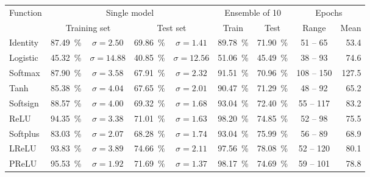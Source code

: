 \begin{table}[H]
    \centering
    \setlength\tabcolsep{1.5pt}
    \begin{tabular}{@{\extracolsep{4pt}}lcccccccr@{}}
    \toprule
    \multirow{2}{*}{Function} & \multicolumn{4}{c}{Single model}              & \multicolumn{2}{c}{Ensemble of 10} & \multicolumn{2}{c}{Epochs}\\\cline{2-5}\cline{6-7}\cline{8-9}
                              & \multicolumn{2}{c}{Training set}     &\multicolumn{2}{c}{Test set}                  & Train                & Test                 & Range     & \multicolumn{1}{c}{Mean} \\\midrule
    Identity                  & \SI{87.49}{\percent} & $\sigma=2.50$ & \SI{69.86}{\percent} & $\sigma=1.41$         & \SI{89.78}{\percent} & \SI{71.90}{\percent} & \hphantom{0}51 -- \hphantom{0}65  &  53.4\\
    Logistic                  & \SI{45.32}{\percent} & $\sigma=14.88$& \SI{40.85}{\percent} & $\sigma=12.56$        & \SI{51.06}{\percent} & \SI{45.49}{\percent} & \hphantom{0}38 -- \hphantom{0}93  &  74.6\\
    Softmax                   & \SI{87.90}{\percent} & $\sigma=3.58$ & \SI{67.91}{\percent} & $\sigma=2.32$         & \SI{91.51}{\percent} & \SI{70.96}{\percent} & 108 -- 150           & 127.5\\
    Tanh                      & \SI{85.38}{\percent} & $\sigma=4.04$ & \SI{67.65}{\percent} & $\sigma=2.01$         & \SI{90.47}{\percent} & \SI{71.29}{\percent} & 48 -- \hphantom{0}92 & 65.2\\
    Softsign                  & \SI{88.57}{\percent} & $\sigma=4.00$ & \SI{69.32}{\percent} & $\sigma=1.68$         & \SI{93.04}{\percent} & \SI{72.40}{\percent} & 55 -- 117            & 83.2\\
    \gls{ReLU}                & \SI{94.35}{\percent} & $\sigma=3.38$ & \SI{71.01}{\percent} & $\sigma=1.63$         & \SI{98.20}{\percent} & \SI{74.85}{\percent} & 52 -- \hphantom{0}98 & 75.5\\
    Softplus                  & \SI{83.03}{\percent} & $\sigma=2.07$ & \SI{68.28}{\percent} & $\sigma=1.74$         & \SI{93.04}{\percent} & \SI{75.99}{\percent} & 56 -- \hphantom{0}89 & 68.9\\
    \gls{LReLU}               & \SI{93.83}{\percent} & $\sigma=3.89$ & \SI{74.66}{\percent} & $\sigma=2.11$         & \SI{97.56}{\percent} & \SI{78.08}{\percent} & 52 -- 120 & 80.1\\
    \gls{PReLU}               & \SI{95.53}{\percent} & $\sigma=1.92$ & \SI{71.69}{\percent} & $\sigma=1.37$         & \SI{98.17}{\percent} & \SI{74.69}{\percent} & 59 -- 101 & 78.8\\

\end{tabular}
\end{table}
